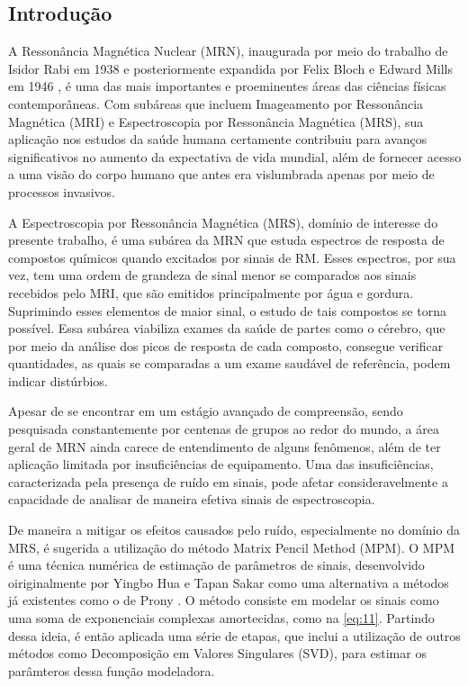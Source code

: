 \documentclass{article}
\begin{document}
\subsection{Introdução}

A Ressonância Magnética Nuclear (MRN), inaugurada por meio do trabalho de Isidor Rabi em 1938 \cite{PhysRev.53.318} e 
posteriormente expandida por Felix Bloch e Edward Mills em 1946 \cite{Filler2009}, é uma das mais importantes e proeminentes áreas das
ciências físicas contemporâneas. Com subáreas que incluem Imageamento por Ressonância Magnética (MRI) e 
Espectroscopia por Ressonância Magnética (MRS), sua aplicação nos estudos da saúde humana certamente contribuiu para
avanços significativos no aumento da expectativa de vida mundial, além de fornecer acesso a uma visão do corpo humano que antes
era vislumbrada apenas por meio de processos invasivos.

A Espectroscopia por Ressonância Magnética (MRS), domínio de interesse do presente trabalho, é uma subárea da MRN que estuda espectros de resposta de compostos químicos 
quando excitados por sinais de RM. Esses espectros, por sua vez, tem uma ordem de grandeza de sinal menor se comparados aos 
sinais recebidos pelo MRI, que são emitidos principalmente por água e gordura. Suprimindo esses elementos de maior sinal, 
o estudo de tais compostos se torna possível. Essa subárea viabiliza exames da saúde de partes como o cérebro, 
que por meio da análise dos picos de resposta de cada composto, consegue verificar quantidades, as quais se comparadas a um exame 
saudável de referência, podem indicar distúrbios.

Apesar de se encontrar em um estágio avançado de compreensão, sendo pesquisada constantemente por centenas de grupos ao redor do mundo, a 
área geral de MRN ainda carece de entendimento de alguns fenômenos, além de ter aplicação limitada por insuficiências de equipamento. 
Uma das insuficiências, caracterizada pela presença de ruído em sinais, pode afetar consideravelmente a capacidade de 
analisar de maneira efetiva sinais de espectroscopia. 

De maneira a mitigar os efeitos causados pelo ruído, especialmente no domínio da MRS, é sugerida a utilização do método Matrix Pencil Method (MPM). O MPM é uma técnica numérica
de estimação de parâmetros de sinais, desenvolvido oiriginalmente por Yingbo Hua e Tapan Sakar \cite{370583} como uma alternativa a métodos já existentes 
como o de Prony \cite{49090}. O método consiste em modelar os sinais como uma soma de exponenciais complexas amortecidas, como na \autoref{eq:11}. Partindo 
dessa ideia, é então aplicada uma série de etapas, que inclui a utilização de outros métodos como Decomposição em Valores Singulares (SVD), para estimar
os parâmteros dessa função modeladora.  
\end{document}
